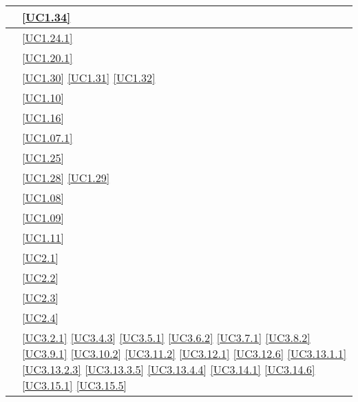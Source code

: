 \begin{longtable}{|P{6cm}|P{6cm}|}
	\hline {} & \ref{UC1.34} \\
	\hline {} & \ref{UC1.24.1} \\
	\hline {} & \ref{UC1.20.1} \\	
	\hline {} & \ref{UC1.30} \linebreak \ref{UC1.31} \linebreak \ref{UC1.32} \\
	\hline {} & \ref{UC1.10} \\
	\hline {} & \ref{UC1.16} \\
	\hline {} & \ref{UC1.07.1} \\
	\hline {} & \ref{UC1.25} \\
	\hline {} & \ref{UC1.28} \linebreak \ref{UC1.29}  \\	 
	\hline {} & \ref{UC1.08} \\
	\hline {} & \ref{UC1.09} \\
	\hline {} & \ref{UC1.11} \\	
	\hline {} & \ref{UC2.1} \\
	\hline {} & \ref{UC2.2} \\
	\hline {} & \ref{UC2.3} \\
	\hline {} & \ref{UC2.4} \\	
	\hline {} & \ref{UC3.2.1} \linebreak \ref{UC3.4.3} \linebreak \ref{UC3.5.1} \linebreak \ref{UC3.6.2} \linebreak \ref{UC3.7.1} \linebreak \ref{UC3.8.2} \linebreak \ref{UC3.9.1} \linebreak \ref{UC3.10.2} \linebreak \ref{UC3.11.2} \linebreak  \ref{UC3.12.1} \linebreak \ref{UC3.12.6} \linebreak  \ref{UC3.13.1.1} \linebreak \ref{UC3.13.2.3} \linebreak \ref{UC3.13.3.5} \linebreak \ref{UC3.13.4.4} \linebreak \ref{UC3.14.1} \linebreak \ref{UC3.14.6} \linebreak \ref{UC3.15.1} \linebreak \ref{UC3.15.5} \\

\end{longtable}
